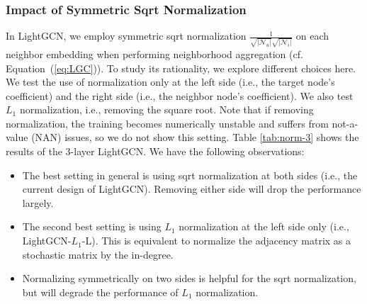 \documentclass[sigconf]{acmart}
\theoremstyle{definition}
\begin{document}
\subsubsection{Impact of Symmetric Sqrt Normalization}\label{ss:ablation-symmetric}
In LightGCN, we employ symmetric sqrt normalization $\frac{1}{\sqrt{|\mathcal{N}_u|}\sqrt{|\mathcal{N}_i|}}$ on each neighbor embedding when performing neighborhood aggregation (cf. Equation~(\ref{eq:LGC})). To study its rationality, we explore different choices here. We test the use of normalization only at the left side (i.e., the target node's coefficient) and the right side (i.e., the neighbor node's coefficient). 
We also test $L_1$ normalization, i.e.,  removing the square root. 
Note that if removing normalization, the training becomes numerically unstable and suffers from not-a-value (NAN) issues, so we do not show this setting. 
Table \ref{tab:norm-3} shows the results of the 3-layer LightGCN. We have the following observations:
\begin{itemize}[leftmargin=*]
    \item The best setting in general is using sqrt normalization at both sides (i.e., the current design of LightGCN). Removing either side will drop the performance largely.
    \item The second best setting is using $L_1$ normalization at the left side only (i.e., LightGCN-$L_1$-L). This is equivalent to normalize the adjacency matrix as a stochastic matrix by the in-degree. 
    \item Normalizing symmetrically on two sides is helpful for the sqrt normalization, but will degrade the performance of $L_1$ normalization. 
\end{itemize}
\end{document}
